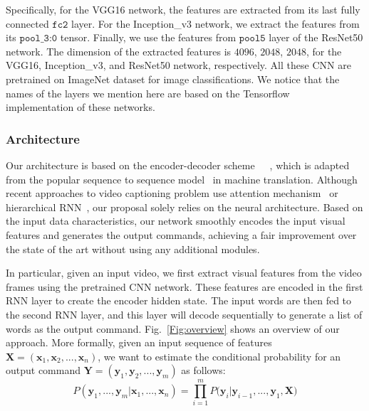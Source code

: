 Specifically, for the VGG16 network, the features are extracted from its last fully connected $\texttt{fc2}$ layer. For the Inception\_v3 network, we extract the features from its $\texttt{pool\_3:0}$ tensor. Finally, we use the features from $\texttt{pool5}$ layer of the ResNet50 network. The dimension of the extracted features is $4096$, $2048$, $2048$, for the VGG16, Inception\_v3, and ResNet50 network, respectively. All these CNN are pretrained on ImageNet dataset for image classifications. We notice that the names of the layers we mention here are based on the Tensorflow~\cite{TensorFlow2015} implementation of these networks.



\subsubsection{Architecture}
Our architecture is based on the encoder-decoder scheme~\cite{Venugopalan2016}~\cite{venugopalan2014translating}~\cite{Ramanishka2017cvpr}, which is adapted from the popular sequence to sequence model~\cite{Sutskever2014_Seq} in machine translation. Although recent approaches to video captioning problem use attention mechanism~\cite{Ramanishka2017cvpr} or hierarchical RNN~\cite{Haonan2016}, our proposal solely relies on the neural architecture. Based on the input data characteristics, our network smoothly encodes the input visual features and generates the output commands, achieving a fair improvement over the state of the art without using any additional modules.

In particular, given an input video, we first extract visual features from the video frames using the pretrained CNN network. These features are encoded in the first RNN layer to create the encoder hidden state. The input words are then fed to the second RNN layer, and this layer will decode sequentially to generate a list of words as the output command. Fig.~\ref{Fig:overview} shows an overview of our approach. More formally, given an input sequence of features $\mathbf{X} = (\mathbf{x}_1, \mathbf{x}_2, ..., \mathbf{x}_n)$, we want to estimate the conditional probability for an output command  $\mathbf{Y}=(\mathbf{y}_1, \mathbf{y}_2, ..., \mathbf{y}_m)$ as follows:
\begin{equation} \label{Eq_mainP1}
P(\mathbf{y}_1, ..., \mathbf{y}_m | \mathbf{x}_1, ..., \mathbf{x}_n) = \prod\limits_{i = 1}^m {P({\mathbf{y}_i}|{\mathbf{y}_{i - 1}}, ...,{\mathbf{y}_1}},\mathbf{X})
\end{equation}

